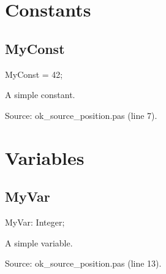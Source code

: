 \documentclass{report}
\begin{document}
\section{Constants}
\subsection*{MyConst}
\begin{list}{}{
\setlength{\itemindent}{0cm}
\setlength{\listparindent}{0cm}
\setlength{\leftmargin}{\evensidemargin}
\addtolength{\leftmargin}{\tmplength}
\settowidth{\labelsep}{X}
\addtolength{\leftmargin}{\labelsep}
\setlength{\labelwidth}{\tmplength}
}
\begin{flushleft}
\item[\textbf{Declaration}\hfill]
\begin{ttfamily}
MyConst = 42;\end{ttfamily}


\end{flushleft}
\par
\item[\textbf{Description}]
A simple constant.\par
Source: ok{\_}source{\_}position.pas (line 7).

\end{list}
\section{Variables}
\subsection*{MyVar}
\begin{list}{}{
\setlength{\itemindent}{0cm}
\setlength{\listparindent}{0cm}
\setlength{\leftmargin}{\evensidemargin}
\addtolength{\leftmargin}{\tmplength}
\settowidth{\labelsep}{X}
\addtolength{\leftmargin}{\labelsep}
\setlength{\labelwidth}{\tmplength}
}
\begin{flushleft}
\item[\textbf{Declaration}\hfill]
\begin{ttfamily}
MyVar: Integer;\end{ttfamily}


\end{flushleft}
\par
\item[\textbf{Description}]
A simple variable.\par
Source: ok{\_}source{\_}position.pas (line 13).

\end{list}
\end{document}
